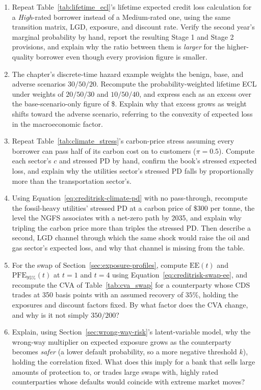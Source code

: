 \documentclass[../ai_in_finance]{subfiles}
\begin{document}
\begin{enumerate}[exercises]
    \item Repeat Table~\ref{tab:lifetime_ecl}'s lifetime expected credit loss calculation for a \emph{High}-rated borrower instead of a Medium-rated one, using the same transition matrix, LGD, exposure, and discount rate. Verify the second year's marginal probability by hand, report the resulting Stage 1 and Stage 2 provisions, and explain why the ratio between them is \emph{larger} for the higher-quality borrower even though every provision figure is smaller.
    \item The chapter's discrete-time hazard example weights the benign, base, and adverse scenarios $30/50/20$. Recompute the probability-weighted lifetime ECL under weights of $20/50/30$ and $10/50/40$, and express each as an excess over the base-scenario-only figure of \$\vChNineHazECLBase. Explain why that excess grows as weight shifts toward the adverse scenario, referring to the convexity of expected loss in the macroeconomic factor.
    \item Repeat Table~\ref{tab:climate_stress}'s carbon-price stress assuming every borrower can pass half of its carbon cost on to customers ($\pi = 0.5$). Compute each sector's $c$ and stressed PD by hand, confirm the book's stressed expected loss, and explain why the utilities sector's stressed PD falls by proportionally more than the transportation sector's.
    \item Using Equation~\eqref{eq:creditrisk-climate-pd} with no pass-through, recompute the fossil-heavy utilities' stressed PD at a carbon price of \$300 per tonne, the level the NGFS associates with a net-zero path by 2035, and explain why tripling the carbon price more than triples the stressed PD. Then describe a second, LGD channel through which the same shock would raise the oil and gas sector's expected loss, and why that channel is missing from the table.
    \item For the swap of Section~\ref{sec:exposure-profiles}, compute $\text{EE}(t)$ and $\text{PFE}_{95\%}(t)$ at $t = 1$ and $t = 4$ using Equation~\eqref{eq:creditrisk-swap-ee}, and recompute the CVA of Table~\ref{tab:cva_swap} for a counterparty whose CDS trades at 350 basis points with an assumed recovery of $35\%$, holding the exposures and discount factors fixed. By what factor does the CVA change, and why is it not simply $350/200$?
    \item Explain, using Section~\ref{sec:wrong-way-risk}'s latent-variable model, why the wrong-way multiplier on expected exposure grows as the counterparty becomes \emph{safer} (a lower default probability, so a more negative threshold $k$), holding the correlation fixed. What does this imply for a bank that sells large amounts of protection to, or trades large swaps with, highly rated counterparties whose defaults would coincide with extreme market moves?

\end{enumerate}
\end{document}
